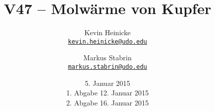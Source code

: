 


\title{%
    V47 -- Molwärme von Kupfer
}
\author{%
    Kevin Heinicke\\
    \texttt{\href{mailto:kevin.heinicke@udo.edu}{kevin.heinicke@udo.edu}}
    \and
    Markus Stabrin\\
    \texttt{\href{mailto:markus.stabrin@udo.edu}{markus.stabrin@udo.edu}}
}
\date{%
    5. Januar 2015\\
    {\small 1. Abgabe} 12. Januar 2015\\
    {\small 2. Abgabe} 16. Januar 2015
}

    \maketitle%
    \tableofcontents
    \newpage

    
    
    
    \printbibliography

